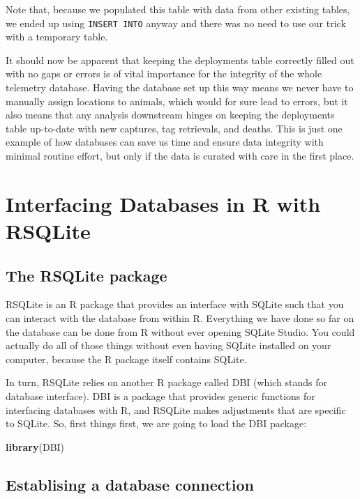 \documentclass[
]{book}
\newenvironment{Shaded}{\begin{snugshade}}{\end{snugshade}}
\newcommand{\FunctionTok}[1]{\textcolor[rgb]{0.13,0.29,0.53}{\textbf{#1}}}
\newcommand{\NormalTok}[1]{#1}
\begin{document}
Note that, because we populated this table with data from other existing tables,
we ended up using \texttt{INSERT\ INTO} anyway and there was no need to use our trick
with a temporary table.

It should now be apparent that keeping the deployments table correctly filled
out with no gaps or errors is of vital importance for the integrity of the whole
telemetry database. Having the database set up this way means we never have to
manually assign locations to animals, which would for sure lead to errors, but
it also means that any analysis downstream hinges on keeping the deployments
table up-to-date with new captures, tag retrievals, and deaths. This is just one
example of how databases can save us time and ensure data integrity with minimal
routine effort, but only if the data is curated with care in the first place.

\hypertarget{rsqlite}{%
\chapter{Interfacing Databases in R with RSQLite}\label{rsqlite}}

\hypertarget{the-rsqlite-package}{%
\section{The RSQLite package}\label{the-rsqlite-package}}

RSQLite is an R package that provides an interface with SQLite such that you can
interact with the database from within R. Everything we have done so far on the database can be done from R without ever opening SQLite Studio. You could
actually do all of those things without even having SQLite installed on your
computer, because the R package itself contains SQLite.

In turn, RSQLite relies on another R package called DBI (which stands for
database interface). DBI is a package that provides generic functions for
interfacing databases with R, and RSQLite makes adjustments that are specific
to SQLite. So, first things first, we are going to load the DBI package:

\begin{Shaded}
\begin{Highlighting}[]
\FunctionTok{library}\NormalTok{(DBI)}
\end{Highlighting}
\end{Shaded}

\hypertarget{establising-a-database-connection}{%
\section{Establising a database connection}\label{establising-a-database-connection}}
\end{document}
